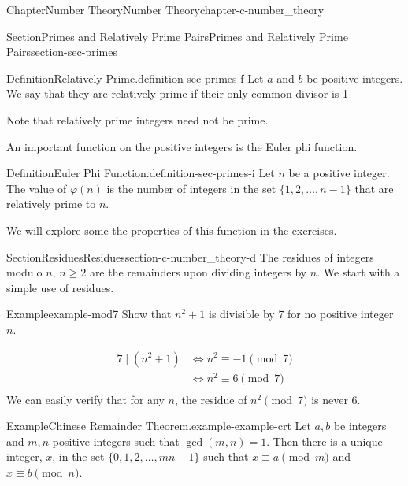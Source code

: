 \documentclass[oneside,10pt,]{book}
\numberwithin{equation}{section}
\begin{document}
\begin{chapterptx}{Chapter}{Number Theory}{}{Number Theory}{}{}{chapter-c-number_theory}
\begin{sectionptx}{Section}{Primes and Relatively Prime Pairs}{}{Primes and Relatively Prime Pairs}{}{}{section-sec-primes}
\begin{definition}{Definition}{Relatively Prime.}{definition-sec-primes-f}%
%
Let \(a\) and \(b\) be positive integers.  We say that they are relatively prime if their only common divisor is 1%
\end{definition}
Note that relatively prime integers need not be prime.%
\par
An important function on the positive integers is the Euler phi function.%
\begin{definition}{Definition}{Euler Phi Function.}{definition-sec-primes-i}%
%
%
\label{notation-sec-primes-i-d}%
Let \(n\) be a positive integer. The value of \(\varphi(n)\) is the number of integers in the set \(\{1, 2,\dots ,n-1\}\) that are relatively prime to \(n\).%
\end{definition}
We will explore some the properties of this function in the exercises.%
\end{sectionptx}
%
%
\typeout{************************************************}
\typeout{************************************************}
%
\begin{sectionptx}{Section}{Residues}{}{Residues}{}{}{section-c-number_theory-d}
The residues of integers modulo \(n\), \(n \geq 2\) are the remainders upon dividing integers by \(n\).  We start with a simple use of residues.%
\begin{example}{Example}{}{example-mod7}%
Show that \(n^2+ 1\) is divisible by 7 for no positive integer \(n\).%
\par
%
\begin{equation*}
\begin{split}
7 \mid (n^2+1) & \Leftrightarrow n^2 \equiv -1\pmod{7}\\
& \Leftrightarrow n^2 \equiv  6\pmod{7}\\
\end{split}
\end{equation*}
We can easily verify that for any \(n\), the residue of \(n^2\pmod{7}\) is never 6.%
\end{example}
\begin{example}{Example}{Chinese Remainder Theorem.}{example-example-crt}%
%
Let \(a, b\) be integers and \(m, n\) positive integers such that \(\gcd (m,n)=1\). Then there is a unique integer, \(x\), in the set \(\{0,1,2,\ldots , m n -1\}\) such that \(x\equiv a \pmod{m}\) and \(x\equiv b\pmod{n}\).%
\par

\end{example}
\end{sectionptx}
\end{chapterptx}
\end{document}
